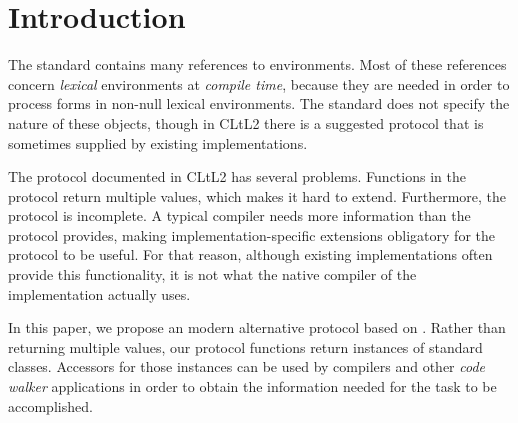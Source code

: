 \section{Introduction}

The \commonlisp{} standard contains many references to environments.
Most of these references concern \emph{lexical} environments at
\emph{compile time}, because they are needed in order to process forms
in non-null lexical environments.  The standard does not specify the
nature of these objects, though in CLtL2 \cite{Steele:1990:CLL:95411}
there is a suggested protocol that is sometimes supplied by existing
\commonlisp{} implementations. 

The protocol documented in CLtL2 has several problems.  Functions in
the protocol return multiple values, which makes it hard to extend.
Furthermore, the protocol is incomplete.  A typical compiler needs
more information than the protocol provides, making
implementation-specific extensions obligatory for the protocol to be
useful.  For that reason, although existing \commonlisp{}
implementations often provide this functionality, it is not what the
native compiler of the implementation actually uses.

In this paper, we propose an modern alternative protocol based on
\clos{}.  Rather than returning multiple values, our protocol
functions return instances of standard classes.  Accessors for those
instances can be used by compilers and other \emph{code walker}
applications in order to obtain the information needed for the task to
be accomplished.


